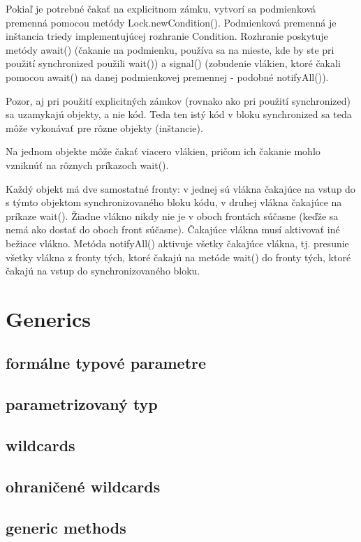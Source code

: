 Pokiaľ je potrebné čakať na explicitnom zámku, vytvorí sa podmienková premenná pomocou metódy Lock.newCondition(). Podmienková premenná je inštancia triedy implementujúcej rozhranie Condition. Rozhranie poskytuje metódy await() (čakanie na podmienku, používa sa na mieste, kde by ste pri použití synchronized použili wait()) a signal() (zobudenie vlákien, ktoré čakali pomocou await() na danej podmienkovej premennej - podobné notifyAll()).


Pozor, aj pri použití explicitných zámkov (rovnako ako pri použití synchronized) sa uzamykajú objekty, a nie kód. Teda ten istý kód v bloku synchronized sa teda môže vykonávať pre rôzne objekty (inštancie).

Na jednom objekte môže čakať viacero vlákien, pričom ich čakanie mohlo vzniknúť na rôznych príkazoch wait().

Každý objekt má dve samostatné fronty: v jednej sú vlákna čakajúce na vstup do s týmto objektom synchronizovaného bloku kódu, v druhej vlákna čakajúce na príkaze wait(). Žiadne vlákno nikdy nie je v oboch frontách súčasne (keďže sa nemá ako dostať do oboch front súčasne). Čakajúce vlákna musí aktivovať iné bežiace vlákno. Metóda notifyAll() aktivuje všetky čakajúce vlákna, tj. presunie všetky vlákna z fronty tých, ktoré čakajú na metóde wait() do fronty tých, ktoré čakajú na vstup do synchronizovaného bloku.



\section{Generics}
	\subsection{formálne typové parametre}
	\subsection{parametrizovaný typ}
	\subsection{wildcards}
	\subsection{ohraničené wildcards}
	\subsection{generic methods}

